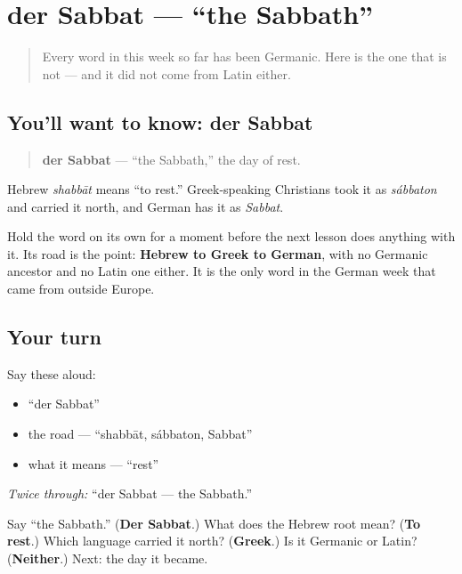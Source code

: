 \section[der Sabbat]{der Sabbat — \textquotedblleft{}the Sabbath\textquotedblright{}}

\label{lesson:GE-C07-sabbat}



\begin{quote}
Every word in this week so far has been Germanic. Here is the one that is not — and it did not come from Latin either.
\end{quote}

\subsection*{You'll want to know: der Sabbat}
\begin{quote}
\textbf{der Sabbat} — \textquotedblleft{}the Sabbath,\textquotedblright{} the day of rest.
\end{quote}

Hebrew \emph{shabbāt} means \textquotedblleft{}to rest.\textquotedblright{} Greek-speaking Christians took it as \emph{sábbaton} and carried it north, and German has it as \emph{Sabbat}.

Hold the word on its own for a moment before the next lesson does anything with it. Its road is the point: \textbf{Hebrew to Greek to German}, with no Germanic ancestor and no Latin one either. It is the only word in the German week that came from outside Europe.

\subsection*{Your turn}
Say these aloud:

\begin{itemize}
\raggedright
  \item \textquotedblleft{}der Sabbat\textquotedblright{}
  \item the road — \textquotedblleft{}shabbāt, sábbaton, Sabbat\textquotedblright{}
  \item what it means — \textquotedblleft{}rest\textquotedblright{}
\end{itemize}

\emph{Twice through:} \textquotedblleft{}der Sabbat — the Sabbath.\textquotedblright{}

\begin{tcolorbox}[breakable,colback=teal!4,colframe=teal!35!black,title={Before you move on}]
Say \textquotedblleft{}the Sabbath.\textquotedblright{} (\textbf{Der Sabbat}.) What does the Hebrew root mean? (\textbf{To rest}.) Which language carried it north? (\textbf{Greek}.) Is it Germanic or Latin? (\textbf{Neither}.) Next: the day it became.
\end{tcolorbox}
